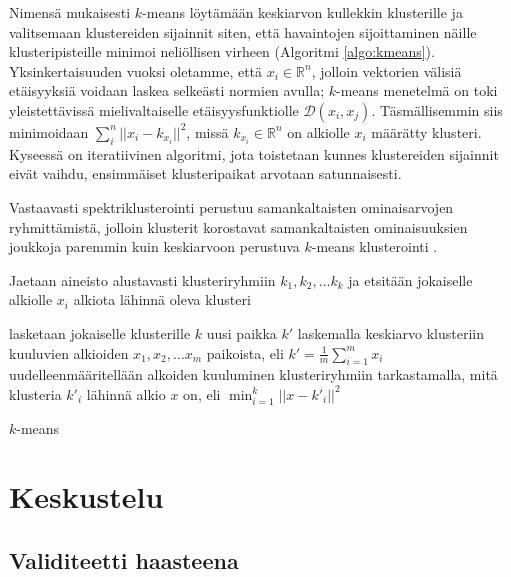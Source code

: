 \documentclass[finnish,gradu,twoside,12pt]{tktltiki}
\begin{document}
{Nimensä mukaisesti $k$-means löytämään keskiarvon kullekkin klusterille ja valitsemaan klustereiden sijainnit siten, että havaintojen sijoittaminen näille klusteripisteille minimoi neliöllisen virheen (Algoritmi \ref{algo:kmeans}). Yksinkertaisuuden vuoksi oletamme, että $x_i \in \mathbb{R}^n$, jolloin vektorien välisiä etäisyyksiä voidaan laskea selkeästi normien avulla; $k$-means menetelmä on toki yleistettävissä mielivaltaiselle etäisyysfunktiolle $\mathcal{D}(x_i, x_j)$. Täsmällisemmin siis minimoidaan $\sum_i^n ||x_i - k_{x_i}||^2$, missä $k_{x_i} \in \mathbb{R}^n$ on alkiolle $x_i$ määrätty klusteri. Kyseessä on iteratiivinen algoritmi, jota toistetaan kunnes klustereiden sijainnit eivät vaihdu, ensimmäiset klusteripaikat arvotaan satunnaisesti.

Vastaavasti spektriklusterointi perustuu samankaltaisten ominaisarvojen ryhmittämistä, jolloin klusterit korostavat samankaltaisten ominaisuuksien joukkoja paremmin kuin keskiarvoon perustuva $k$-means klusterointi \citep[485--586]{Hastie2009}.

\begin{algorithm}
\begin{algorithmic}

\State Jaetaan aineisto alustavasti klusteriryhmiin $k_1, k_2, \ldots k_k$ ja etsitään jokaiselle alkiolle $x_i$ alkiota lähinnä oleva klusteri


\State lasketaan jokaiselle klusterille $k$ uusi paikka $k'$ laskemalla keskiarvo klusteriin kuuluvien alkioiden $x_{1}, x_{2}, \ldots x_{m}$ paikoista, eli $k' = \frac{1}{m} \sum_{i=1}^m x_i $
\State uudelleenmääritellään alkoiden kuuluminen klusteriryhmiin tarkastamalla, mitä klusteria $k'_i$ lähinnä alkio $x$ on, eli $\min_{i=1}^k || x - k'_i || ^ 2$

\EndWhile

\end{algorithmic}
\caption{$k$-means}
\label{algo:kmeans}
\end{algorithm}


\section{Keskustelu}

\subsection{Validiteetti haasteena}

}
\end{document}
